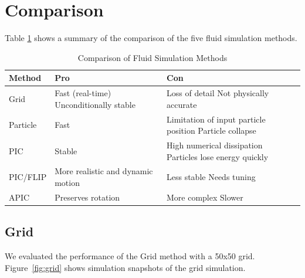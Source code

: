 \section{Comparison}

Table \ref{tab:fluid_comparison} shows a summary of the comparison of the five fluid simulation methods.

\begin{table}[!htbp]
\centering
\caption{Comparison of Fluid Simulation Methods}
\label{tab:fluid_comparison}
\begin{tabularx}{\columnwidth}{l X X}
\toprule
\textbf{Method} & \textbf{Pro} & \textbf{Con} \\
\midrule
Grid&
Fast (real-time) \newline
Unconditionally stable &
Loss of detail \newline
Not physically accurate \\
\midrule
Particle&
Fast &
Limitation of input particle position \newline
Particle collapse \\
\midrule
PIC&
Stable &
High numerical dissipation \newline
Particles lose energy quickly \\
\midrule
PIC/FLIP &
More realistic and dynamic motion &
Less stable \newline
Needs tuning \\
\midrule
APIC &
Preserves rotation &
More complex \newline
Slower \\
\bottomrule
\end{tabularx}
\end{table}

\subsection{Grid}

We evaluated the performance of the Grid method with a 50x50 grid. Figure~\ref{fig:grid} shows simulation snapshots of the grid simulation.


